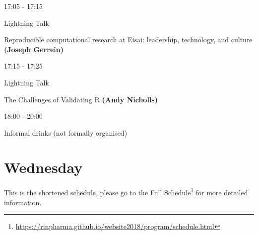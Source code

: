 \documentclass[]{book}
\renewcommand{\href}[2]{#2\footnote{\url{#1}}}
\theoremstyle{definition}
\theoremstyle{definition}
\theoremstyle{definition}
\theoremstyle{remark}
\begin{document}
17:05 - 17:15

Lightning Talk

Reproducible computational research at Eisai: leadership, technology,
and culture \textbf{(Joseph Gerrein)}

17:15 - 17:25

Lightning Talk

The Challenges of Validating R \textbf{(Andy Nicholls)}

18:00 - 20:00

Informal drinks (not formally organised)

\hypertarget{wednesday}{%
\section{Wednesday}\label{wednesday}}

This is the shortened schedule, please go to
\href{https://rinpharma.github.io/website2018/program/schedule.html}{the Full Schedule} for
more detailed information.
\end{document}

